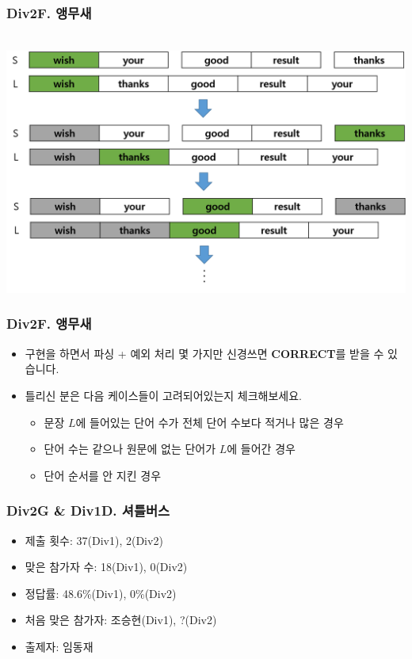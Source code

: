 \documentclass[xetex]{beamer}
\begin{document}
\begin{frame}
  \frametitle{Div2F. 앵무새}
  \begin{center}
    \includegraphics[width=1\textwidth]{parrot-sol.png}
  \end{center}
\end{frame}

\begin{frame}
  \frametitle{Div2F. 앵무새}
  \begin{itemize}
    \item 구현을 하면서 파싱 + 예외 처리 몇 가지만 신경쓰면 \textbf{CORRECT}를 받을 수 있습니다.
    \item 틀리신 분은 다음 케이스들이 고려되어있는지 체크해보세요.
    \begin{itemize}
      \item 문장 $L$에 들어있는 단어 수가 전체 단어 수보다 적거나 많은 경우
      \item 단어 수는 같으나 원문에 없는 단어가 $L$에 들어간 경우
      \item 단어 순서를 안 지킨 경우
    \end{itemize}
  \end{itemize}
\end{frame}

\begin{frame}
  \frametitle{Div2G \& Div1D. 셔틀버스}
  \begin{itemize}
    \item 제출 횟수: 37(Div1), 2(Div2)
    \item 맞은 참가자 수: 18(Div1), 0(Div2)
    \item 정답률: 48.6\%(Div1), 0\%(Div2)
    \item 처음 맞은 참가자: 조승현(Div1), ?(Div2)
    \item 출제자: 임동재
  \end{itemize}
\end{frame}
\end{document}
